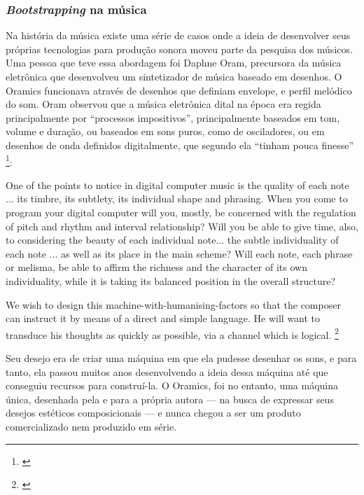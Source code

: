 \subsubsection{\emph{Bootstrapping} na música}

Na história da música existe uma série de casos onde a ideia de desenvolver seus próprias tecnologias para produção sonora moveu parte da pesquisa dos músicos. Uma pessoa que teve essa abordagem foi Daphne Oram, precursora da música eletrônica que desenvolveu um sintetizador de música baseado em desenhos. O Oramics funcionava através de desenhos que definiam envelope, e perfil melódico do som. Oram observou que a música eletrônica dital na época era regida principalmente por ``processos impositivos'', principalmente baseados em tom, volume e duração, ou baseados em sons puros, como de osciladores, ou em desenhos de onda definidos digitalmente, que segundo ela ``tinham pouca finesse'' \footnote{\cite[p. 101]{Oram1972}}: 

\begin{citacao}
One of the points to notice in digital computer music is the
quality of each note ... its timbre, its subtlety, its individual shape and phrasing. When you come to program your digital computer will you, mostly, be concerned with the regulation of pitch and rhythm and interval relationship? Will you be able to give time, also, to considering the beauty of each individual note... the subtle individuality of each note ... as well as its place in the main scheme? Will each note, each phrase or melisma, be able to affirm the richness and the character of its own individuality, while it is taking its balanced position in the overall structure? 

We wish to design this machine-with-humanising-factors so that the composer can instruct it by means of a direct and simple language. He will want to transduce his thoughts as quickly as possible, via a channel which is logical. \footnote{\cite[p. 97]{Oram1972}}
\end{citacao}

Seu desejo era de criar uma máquina em que ela pudesse desenhar os sons, e para tanto, ela passou muitos anos desenvolvendo a ideia dessa máquina até que conseguiu recursos para construí-la. O Oramics, foi no entanto, uma máquina única, desenhada pela e para a própria autora --- na busca de expressar seus desejos estéticos composicionais --- e nunca chegou a ser um produto comercializado nem produzido em série.   

